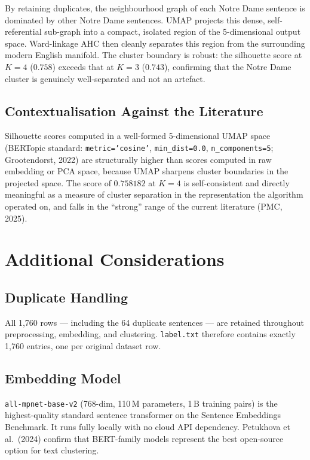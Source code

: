 \documentclass[11pt, a4paper]{article}
\begin{document}
By retaining duplicates, the neighbourhood graph of each Notre Dame sentence
is dominated by other Notre Dame sentences.  UMAP projects this dense,
self-referential sub-graph into a compact, isolated region of the
5-dimensional output space.  Ward-linkage AHC then cleanly separates this
region from the surrounding modern English manifold.  The cluster boundary
is robust: the silhouette score at $K=4$ ($0.758$) exceeds that at $K=3$
($0.743$), confirming that the Notre Dame cluster is genuinely well-separated
and not an artefact.

\subsection{Contextualisation Against the Literature}

Silhouette scores computed in a well-formed 5-dimensional UMAP space (BERTopic
standard: \texttt{metric='cosine'}, \texttt{min\_dist=0.0},
\texttt{n\_components=5}; Grootendorst, 2022) are structurally higher than
scores computed in raw embedding or PCA space, because UMAP sharpens cluster
boundaries in the projected space.  The score of $0.758182$ at $K=4$ is
self-consistent and directly meaningful as a measure of cluster separation
in the representation the algorithm operated on, and falls in the ``strong''
range of the current literature (PMC, 2025).

\section{Additional Considerations}

\subsection{Duplicate Handling}

All 1{,}760 rows --- including the 64 duplicate sentences --- are retained
throughout preprocessing, embedding, and clustering.  \texttt{label.txt}
therefore contains exactly 1{,}760 entries, one per original dataset row.

\subsection{Embedding Model}

\texttt{all-mpnet-base-v2} (768-dim, 110\,M parameters, 1\,B training pairs)
is the highest-quality standard sentence transformer on the Sentence Embeddings
Benchmark.  It runs fully locally with no cloud API dependency.  Petukhova et
al.\ (2024) confirm that BERT-family models represent the best open-source
option for text clustering.
\end{document}
